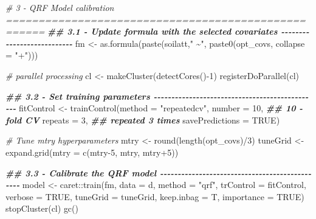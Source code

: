 \documentclass[
  10pt,
  b5paper,
  oneside]{book}
\newenvironment{Shaded}{\begin{snugshade}}{\end{snugshade}}
\newcommand{\AttributeTok}[1]{\textcolor[rgb]{0.77,0.63,0.00}{#1}}
\newcommand{\CommentTok}[1]{\textcolor[rgb]{0.56,0.35,0.01}{\textit{#1}}}
\newcommand{\ConstantTok}[1]{\textcolor[rgb]{0.00,0.00,0.00}{#1}}
\newcommand{\DecValTok}[1]{\textcolor[rgb]{0.00,0.00,0.81}{#1}}
\newcommand{\DocumentationTok}[1]{\textcolor[rgb]{0.56,0.35,0.01}{\textbf{\textit{#1}}}}
\newcommand{\FunctionTok}[1]{\textcolor[rgb]{0.00,0.00,0.00}{#1}}
\newcommand{\NormalTok}[1]{#1}
\newcommand{\OtherTok}[1]{\textcolor[rgb]{0.56,0.35,0.01}{#1}}
\newcommand{\SpecialCharTok}[1]{\textcolor[rgb]{0.00,0.00,0.00}{#1}}
\newcommand{\StringTok}[1]{\textcolor[rgb]{0.31,0.60,0.02}{#1}}
\begin{document}
\begin{Shaded}
\begin{Highlighting}[]
\CommentTok{\# 3 {-} QRF Model calibration ====================================================}
\DocumentationTok{\#\# 3.1 {-} Update formula with the selected covariates {-}{-}{-}{-}{-}{-}{-}{-}{-}{-}{-}{-}{-}{-}{-}{-}{-}{-}{-}{-}{-}{-}{-}{-}{-}{-}{-}}
\NormalTok{fm }\OtherTok{\textless{}{-}} \FunctionTok{as.formula}\NormalTok{(}\FunctionTok{paste}\NormalTok{(soilatt,}\StringTok{" \textasciitilde{}"}\NormalTok{, }\FunctionTok{paste0}\NormalTok{(opt\_covs, }\AttributeTok{collapse =} \StringTok{"+"}\NormalTok{)))}

\CommentTok{\# parallel processing}
\NormalTok{cl }\OtherTok{\textless{}{-}} \FunctionTok{makeCluster}\NormalTok{(}\FunctionTok{detectCores}\NormalTok{()}\SpecialCharTok{{-}}\DecValTok{1}\NormalTok{)}
\FunctionTok{registerDoParallel}\NormalTok{(cl)}

\DocumentationTok{\#\# 3.2 {-} Set training parameters {-}{-}{-}{-}{-}{-}{-}{-}{-}{-}{-}{-}{-}{-}{-}{-}{-}{-}{-}{-}{-}{-}{-}{-}{-}{-}{-}{-}{-}{-}{-}{-}{-}{-}{-}{-}{-}{-}{-}{-}{-}{-}{-}{-}{-}{-}{-}}
\NormalTok{fitControl }\OtherTok{\textless{}{-}} \FunctionTok{trainControl}\NormalTok{(}\AttributeTok{method =} \StringTok{"repeatedcv"}\NormalTok{,}
                           \AttributeTok{number =} \DecValTok{10}\NormalTok{,         }\DocumentationTok{\#\# 10 {-}fold CV}
                           \AttributeTok{repeats =} \DecValTok{3}\NormalTok{,        }\DocumentationTok{\#\# repeated 3 times}
                           \AttributeTok{savePredictions =} \ConstantTok{TRUE}\NormalTok{)}

\CommentTok{\# Tune mtry hyperparameters}
\NormalTok{mtry }\OtherTok{\textless{}{-}} \FunctionTok{round}\NormalTok{(}\FunctionTok{length}\NormalTok{(opt\_covs)}\SpecialCharTok{/}\DecValTok{3}\NormalTok{)}
\NormalTok{tuneGrid }\OtherTok{\textless{}{-}}  \FunctionTok{expand.grid}\NormalTok{(}\AttributeTok{mtry =} \FunctionTok{c}\NormalTok{(mtry}\DecValTok{{-}5}\NormalTok{, mtry, mtry}\SpecialCharTok{+}\DecValTok{5}\NormalTok{))}

\DocumentationTok{\#\# 3.3 {-} Calibrate the QRF model {-}{-}{-}{-}{-}{-}{-}{-}{-}{-}{-}{-}{-}{-}{-}{-}{-}{-}{-}{-}{-}{-}{-}{-}{-}{-}{-}{-}{-}{-}{-}{-}{-}{-}{-}{-}{-}{-}{-}{-}{-}{-}{-}{-}{-}{-}{-}}
\NormalTok{model }\OtherTok{\textless{}{-}}\NormalTok{ caret}\SpecialCharTok{::}\FunctionTok{train}\NormalTok{(fm,}
                      \AttributeTok{data =}\NormalTok{ d,}
                      \AttributeTok{method =} \StringTok{"qrf"}\NormalTok{,}
                      \AttributeTok{trControl =}\NormalTok{ fitControl,}
                      \AttributeTok{verbose =} \ConstantTok{TRUE}\NormalTok{,}
                      \AttributeTok{tuneGrid =}\NormalTok{ tuneGrid,}
                      \AttributeTok{keep.inbag =}\NormalTok{ T,}
                      \AttributeTok{importance =} \ConstantTok{TRUE}\NormalTok{)}
\FunctionTok{stopCluster}\NormalTok{(cl)}
\FunctionTok{gc}\NormalTok{()}
\end{Highlighting}
\end{Shaded}
\end{document}
